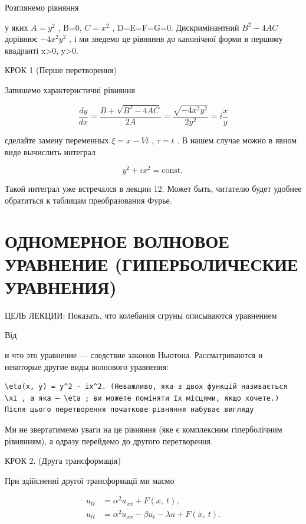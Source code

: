 \documentclass[
  ukrainian,
]{article}
\begin{document}
Розглянемо рівняння

у яких \(A=y^2\) , B=0, \(C=x^2\) , D=E=F=G=0. Дискримінантний
\(B^2-4AC\) дорівнює \(-4x^2y^2\) , і ми зведемо це рівняння до
канонічної форми в першому квадранті x\textgreater0, y\textgreater0.

КРОК 1 (Перше перетворення)

Запишемо характеристичні рівняння

\[
\frac{dy}{dx} = \frac{B + \sqrt{B^2 - 4AC}}{2A} = \frac{\sqrt{-4x^2y^2}}{2y^2} = i\frac{x}{y}
\]

сделайте замену переменных \(\xi = x - Vt\) , \(\tau = t\) . В нашем
случае можно в явном виде вычислить интеграл

\[
y^2 + ix^2 = \text{const},
\]

Такой интеграл уже встречался в лекции 12. Может быть, читателю будет
удобнее обратиться к таблицам преобразования Фурье.

\section{ОДНОМЕРНОЕ ВОЛНОВОЕ УРАВНЕНИЕ (ГИПЕРБОЛИЧЕСКИЕ
УРАВНЕНИЯ)}\label{ux43eux434ux43dux43eux43cux435ux440ux43dux43eux435-ux432ux43eux43bux43dux43eux432ux43eux435-ux443ux440ux430ux432ux43dux435ux43dux438ux435-ux433ux438ux43fux435ux440ux431ux43eux43bux438ux447ux435ux441ux43aux438ux435-ux443ux440ux430ux432ux43dux435ux43dux438ux44f}

ЦЕЛЬ ЛЕКЦИИ: Показать, что колебания сгруны описываются уравнением

Від

и что это уравнение --- следствие законов Ньютона. Рассматриваются и
некоторые другие виды волнового уравнения:

\begin{verbatim}
\eta(x, y) = y^2 - ix^2. (Неважливо, яка з двох функцій називається \xi , а яка — \eta ; ви можете поміняти їх місцями, якщо хочете.) Після цього перетворення початкове рівняння набуває вигляду
\end{verbatim}

Ми не звертатимемо уваги на це рівняння (яке є комплексним гіперболічним
рівнянням), а одразу перейдемо до другого перетворення.

КРОК 2. (Друга трансформація)

При здійсненні другої трансформації ми маємо

\[
\begin{split} u_{tt} &= \alpha^2 u_{xx} + F\left(x, \ t\right), \\ u_{tt} &= \alpha^2 u_{xx} - \beta u_t - \lambda u + F\left(x, \ t\right). \end{split}
\]
\end{document}
